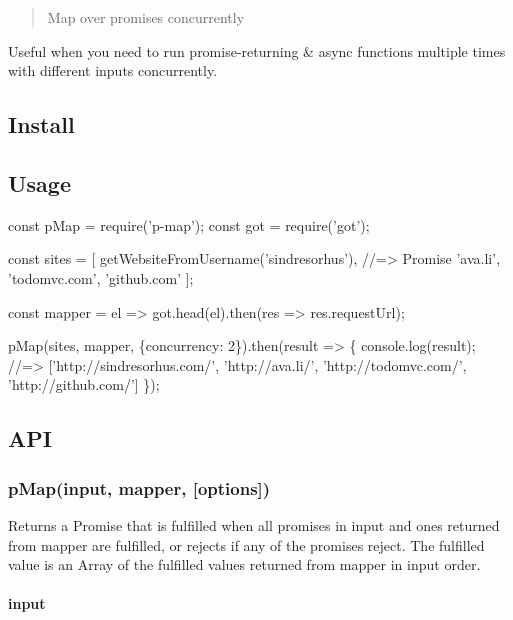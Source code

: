 \begin{quote}
Map over promises concurrently \end{quote}


Useful when you need to run promise-\/returning \& async functions multiple times with different inputs concurrently.

\subsection*{Install}




\subsection*{Usage}


\begin{DoxyCode}
const pMap = require('p-map');
const got = require('got');

const sites = [
    getWebsiteFromUsername('sindresorhus'), //=> Promise
    'ava.li',
    'todomvc.com',
    'github.com'
];

const mapper = el => got.head(el).then(res => res.requestUrl);

pMap(sites, mapper, \{concurrency: 2\}).then(result => \{
    console.log(result);
    //=> ['http://sindresorhus.com/', 'http://ava.li/', 'http://todomvc.com/', 'http://github.com/']
\});
\end{DoxyCode}


\subsection*{A\+PI}

\subsubsection*{p\+Map(input, mapper, \mbox{[}options\mbox{]})}

Returns a {\ttfamily Promise} that is fulfilled when all promises in {\ttfamily input} and ones returned from {\ttfamily mapper} are fulfilled, or rejects if any of the promises reject. The fulfilled value is an {\ttfamily Array} of the fulfilled values returned from {\ttfamily mapper} in {\ttfamily input} order.

\paragraph*{input}

